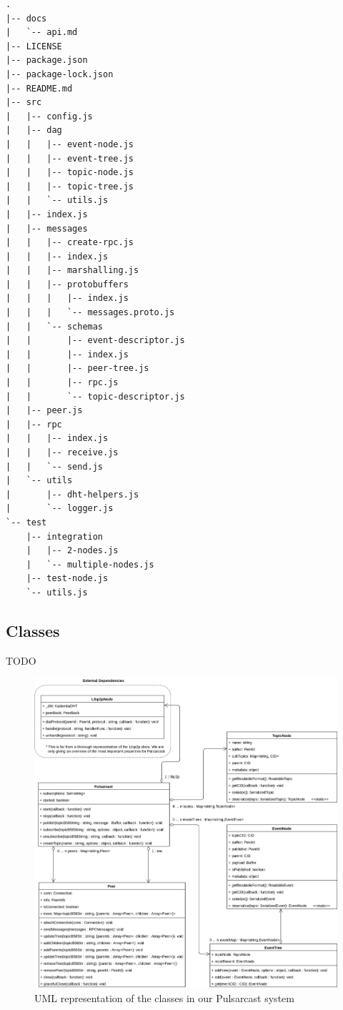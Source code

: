\noindent\begin{minipage}{\textwidth}
\vspace{8pt}
\begin{lstlisting}[caption={File tree for our Pulsarcast implementation},label={file-tree}]
.
|-- docs
|   `-- api.md
|-- LICENSE
|-- package.json
|-- package-lock.json
|-- README.md
|-- src
|   |-- config.js
|   |-- dag
|   |   |-- event-node.js
|   |   |-- event-tree.js
|   |   |-- topic-node.js
|   |   |-- topic-tree.js
|   |   `-- utils.js
|   |-- index.js
|   |-- messages
|   |   |-- create-rpc.js
|   |   |-- index.js
|   |   |-- marshalling.js
|   |   |-- protobuffers
|   |   |   |-- index.js
|   |   |   `-- messages.proto.js
|   |   `-- schemas
|   |       |-- event-descriptor.js
|   |       |-- index.js
|   |       |-- peer-tree.js
|   |       |-- rpc.js
|   |       `-- topic-descriptor.js
|   |-- peer.js
|   |-- rpc
|   |   |-- index.js
|   |   |-- receive.js
|   |   `-- send.js
|   `-- utils
|       |-- dht-helpers.js
|       `-- logger.js
`-- test
    |-- integration
    |   |-- 2-nodes.js
    |   `-- multiple-nodes.js
    |-- test-node.js
    `-- utils.js

\end{lstlisting}
\vspace{8pt}
\end{minipage}


\subsection{Classes}\label{subsec:classes}

TODO

\begin{figure}[hb!]
  \center
  \includegraphics[width=1\textwidth]{img/uml-pulsarcast.png}
  \caption{UML representation of the classes in our Pulsarcast system}
  \label{fig:pulsarcast-uml}
\end{figure}

